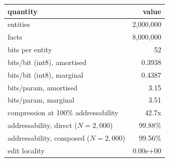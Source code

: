 \begin{tabular}{@{}lr@{}}
\toprule
quantity & value \\
\midrule
entities & 2,000,000 \\
facts & 8,000,000 \\
bits per entity & 52 \\
bits/bit (int8), amortised & 0.3938 \\
bits/bit (int8), marginal & 0.4387 \\
bits/param, amortised & 3.15 \\
bits/param, marginal & 3.51 \\
compression at 100\% addressability & 42.7x \\
addressability, direct ($N=2{,}000$) & 99.88\% \\
addressability, composed ($N=2{,}000$) & 99.56\% \\
edit locality & 0.00e+00 \\
\bottomrule
\end{tabular}
